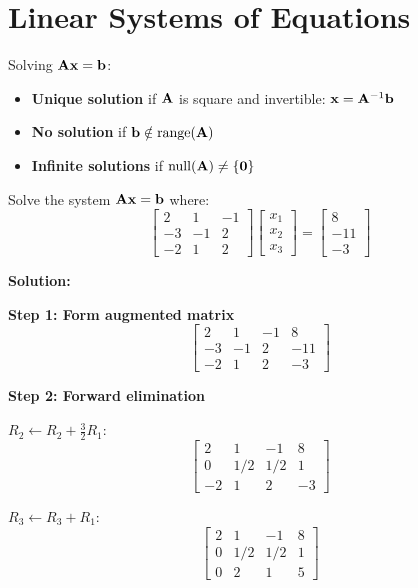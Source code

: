 \section{Linear Systems of Equations}

Solving $\mathbf{A}\mathbf{x} = \mathbf{b}$:
\begin{itemize}
    \item \textbf{Unique solution} if $\mathbf{A}$ is square and invertible: $\mathbf{x} = \mathbf{A}^{-1}\mathbf{b}$
    \item \textbf{No solution} if $\mathbf{b} \notin \operatorname{range}(\mathbf{A})$
    \item \textbf{Infinite solutions} if $\operatorname{null}(\mathbf{A}) \neq \{\mathbf{0}\}$
\end{itemize}

\begin{examplebox}[title=Example: Solving a System Using Gaussian Elimination]
Solve the system $\mathbf{A}\mathbf{x} = \mathbf{b}$ where:
\[
\begin{bmatrix} 2 & 1 & -1 \\ -3 & -1 & 2 \\ -2 & 1 & 2 \end{bmatrix}\begin{bmatrix} x_1 \\ x_2 \\ x_3 \end{bmatrix} = \begin{bmatrix} 8 \\ -11 \\ -3 \end{bmatrix}
\]

\textbf{Solution:}

\textbf{Step 1: Form augmented matrix}
\[
\left[\begin{array}{ccc|c} 2 & 1 & -1 & 8 \\ -3 & -1 & 2 & -11 \\ -2 & 1 & 2 & -3 \end{array}\right]
\]

\textbf{Step 2: Forward elimination}

$R_2 \leftarrow R_2 + \frac{3}{2}R_1$:
\[
\left[\begin{array}{ccc|c} 2 & 1 & -1 & 8 \\ 0 & 1/2 & 1/2 & 1 \\ -2 & 1 & 2 & -3 \end{array}\right]
\]

$R_3 \leftarrow R_3 + R_1$:
\[
\left[\begin{array}{ccc|c} 2 & 1 & -1 & 8 \\ 0 & 1/2 & 1/2 & 1 \\ 0 & 2 & 1 & 5 \end{array}\right]
\]


\end{examplebox}
